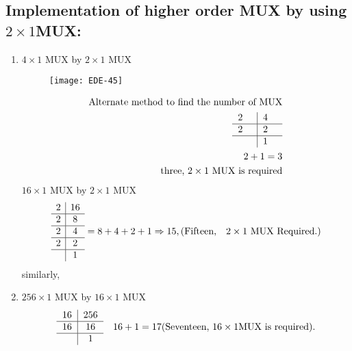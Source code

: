 \subsection{Implementation of higher order MUX by using $2\times 1$MUX:}
\begin{enumerate}
	\item $4\times1$ MUX by $2\times 1$ MUX
	\begin{figure}[H]
		\centering
		\texttt{[image: EDE-45]}
	\end{figure}
	\begin{align*}
	\text{Alternate method to find the number of MUX}\\
	\begin{tabular}{p{0.5cm}|p{0.5cm}}
	2&4\\\hline
	2&2\\\hline
	&1
	\end{tabular}\\
	2+ 1=3\\
	\text{ three, } 2 \times 1\text{ MUX } \text{is required}
	\end{align*}
 $16\times 1$ MUX by $2\times 1$ MUX
	\begin{align*}
	\begin{array}{c|c}
	2 & 16 \\
	\hline 2 & 8\\
\hline	2 & 4 \\
	\hline 2 & 2 \\
	\hline & 1
	\end{array}=8+4+2+1\Rightarrow 15, (\text{Fifteen,}\quad 2 \times 1\text{ MUX
		Required.})
	\end{align*}
	similarly,
	\item $256 \times 1$ MUX by $16 \times 1$ MUX
	\begin{align*}
	\begin{tabular}{c|c}
	16 & 256 \\
	\hline 16 & 16\\
	\hline  &1
	\end{tabular}\quad 16+1=17 (\text{Seventeen, }16 \times 1 \text{MUX is required}) .
	\end{align*}
\end{enumerate}
